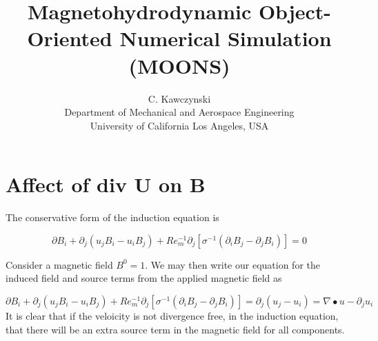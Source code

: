 \documentclass[11pt]{article}
\begin{document}
\doublespacing
\title{Magnetohydrodynamic Object-Oriented Numerical Simulation (MOONS)}
\author{C. Kawczynski \\
Department of Mechanical and Aerospace Engineering \\
University of California Los Angeles, USA\\
}
\maketitle

\section{Affect of div U on B}
The conservative form of the induction equation is

\begin{equation}
\partial B_i + \partial_j (u_j B_i - u_i B_j) + Re_m^{-1} \partial_j \left[ 
\sigma^{-1} \left( \partial_i B_j - \partial_j B_i \right)
\right] = 0
\end{equation}

Consider a magnetic field $B^0 = 1$. We may then write our equation for the induced field and source terms from the applied magnetic field as

\begin{equation}
\partial B_i + \partial_j (u_j B_i - u_i B_j) + Re_m^{-1} \partial_j \left[ 
\sigma^{-1} \left( \partial_i B_j - \partial_j B_i \right)
\right] = 
\partial_j (u_j - u_i) = \nabla \bullet u - \partial_j u_i
\end{equation}
It is clear that if the veloicity is not divergence free, in the induction equation, that there will be an extra source term in the magnetic field for all components.
\end{document}
